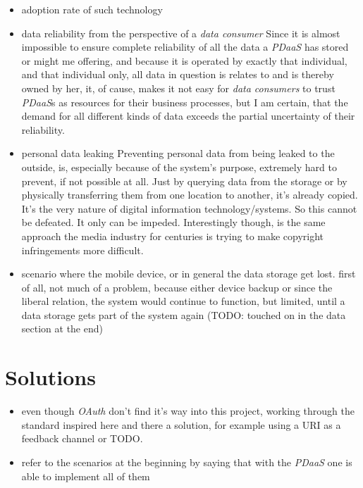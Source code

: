 \documentclass[12pt,english,a4paper,titlepage,cleardoublepage=empty,dottedtoc]{report}
\begin{document}
\begin{itemize}
\item
  adoption rate of such technology
\item
  data reliability from the perspective of a \emph{data consumer} Since
  it is almost impossible to ensure complete reliability of all the data
  a \emph{PDaaS} has stored or might me offering, and because it is
  operated by exactly that individual, and that individual only, all
  data in question is relates to and is thereby owned by her, it, of
  cause, makes it not easy for \emph{data consumers} to trust
  \emph{PDaaS}s as resources for their business processes, but I am
  certain, that the demand for all different kinds of data exceeds the
  partial uncertainty of their reliability.
\item
  personal data leaking Preventing personal data from being leaked to
  the outside, is, especially because of the system's purpose, extremely
  hard to prevent, if not possible at all. Just by querying data from
  the storage or by physically transferring them from one location to
  another, it's already copied. It's the very nature of digital
  information technology/systems. So this cannot be defeated. It only
  can be impeded. Interestingly though, is the same approach the media
  industry for centuries is trying to make copyright infringements more
  difficult.
\item
  scenario where the mobile device, or in general the data storage get
  lost. first of all, not much of a problem, because either device
  backup or since the liberal relation, the system would continue to
  function, but limited, until a data storage gets part of the system
  again (TODO: touched on in the data section at the end)
\end{itemize}

\section{Solutions}\label{solutions}

\begin{itemize}
\item
  even though \emph{OAuth} don't find it's way into this project,
  working through the standard inspired here and there a solution, for
  example using a URI as a feedback channel or TODO.
\item
  refer to the scenarios at the beginning by saying that with the
  \emph{PDaaS} one is able to implement all of them
\end{itemize}
\end{document}
